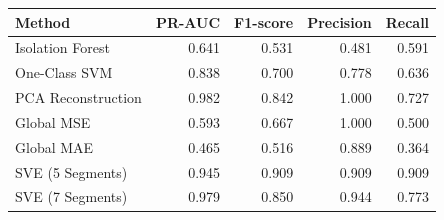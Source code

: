 \begin{tabular}{lrrrr}
\toprule
Method & PR-AUC & F1-score & Precision & Recall \\
\midrule
Isolation Forest & 0.641 & 0.531 & 0.481 & 0.591 \\
One-Class SVM & 0.838 & 0.700 & 0.778 & 0.636 \\
PCA Reconstruction & 0.982 & 0.842 & 1.000 & 0.727 \\
Global MSE & 0.593 & 0.667 & 1.000 & 0.500 \\
Global MAE & 0.465 & 0.516 & 0.889 & 0.364 \\
SVE (5 Segments) & 0.945 & 0.909 & 0.909 & 0.909 \\
SVE (7 Segments) & 0.979 & 0.850 & 0.944 & 0.773 \\
\bottomrule
\end{tabular}
